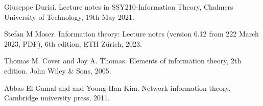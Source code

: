 \documentclass[11pt,a4paper]{article}
\begin{document}
\begin{thebibliography}{9}
    Giuseppe Durisi. Lecture notes in SSY210-Information Theory, Chalmers University of Technology, 19th May 2021.

    Stefan M Moser. Information theory: Lecture notes (version 6.12 from 222 March 2023, PDF), 6th edition, ETH Z{ü}rich, 2023.

    Thomas M. Cover and Joy A. Thomas. Elements of information theory, 2th edition. John Wiley \& Sons, 2005.

    Abbas El Gamal and and Young-Han Kim. Network information theory. Cambridge university press, 2011.

        
\end{thebibliography}
        
    
\end{document}
